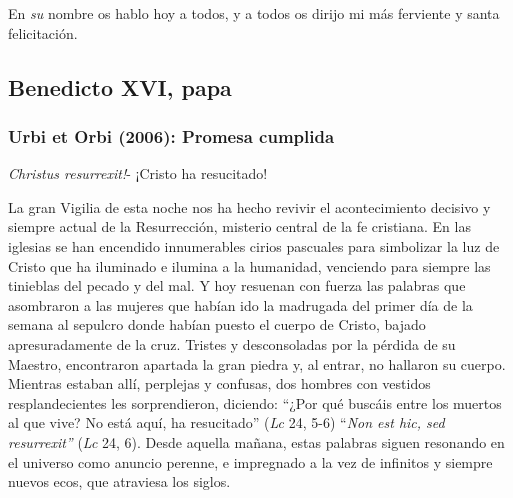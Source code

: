 			\begin{body}En \textit{su} nombre os hablo hoy a todos, y a todos os dirijo mi más ferviente y santa felicitación.\end{body}
			
			\subsection{Benedicto XVI, papa}
			
			\subsubsection{Urbi et Orbi (2006): Promesa cumplida}
			
			\begin{body}\textit{Christus resurrexit!}- ¡Cristo ha resucitado! \end{body}
			
			\begin{body}La gran Vigilia de esta noche nos ha hecho revivir el acontecimiento decisivo y siempre actual de la Resurrección, misterio central de la fe cristiana. En las iglesias se han encendido innumerables cirios pascuales para simbolizar la luz de Cristo que ha iluminado e ilumina a la humanidad, venciendo para siempre las tinieblas del pecado y del mal. Y hoy resuenan con fuerza las palabras que asombraron a las mujeres que habían ido la madrugada del primer día de la semana al sepulcro donde habían puesto el cuerpo de Cristo, bajado apresuradamente de la cruz. Tristes y desconsoladas por la pérdida de su Maestro, encontraron apartada la gran piedra y, al entrar, no hallaron su cuerpo. Mientras estaban allí, perplejas y confusas, dos hombres con vestidos resplandecientes les sorprendieron, diciendo: “¿Por qué buscáis entre los muertos al que vive? No está aquí, ha resucitado” (\textit{Lc }24, 5-6) “\textit{Non est hic, sed resurrexit”} (\textit{Lc} 24, 6). Desde aquella mañana, estas palabras siguen resonando en el universo como anuncio perenne, e impregnado a la vez de infinitos y siempre nuevos ecos, que atraviesa los siglos. \end{body}
			
